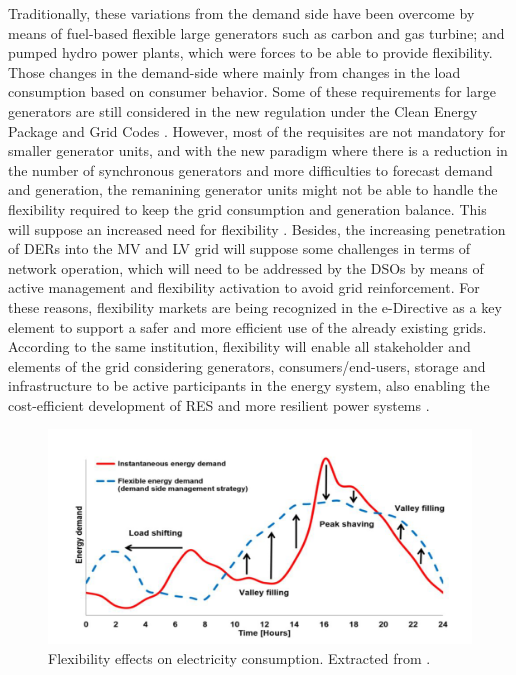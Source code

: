 Traditionally, these variations from the demand side have been overcome by means of fuel-based flexible large generators such as carbon and gas turbine; and pumped hydro power plants, which were forces to be able to provide flexibility. Those changes in the demand-side where mainly from changes in the load consumption based on consumer behavior.
Some of these requirements for large generators are still considered in the new regulation under the Clean Energy Package and Grid Codes \cite{validzic2017clean}. However, most of the requisites are not mandatory for smaller generator units, and with the new paradigm where there is a reduction in the number of synchronous generators and more difficulties to forecast demand and generation, the remanining generator units might not be able to handle the flexibility required to keep the grid consumption and generation balance. This will suppose an increased need for flexibility \cite{Xu2019}. Besides, the increasing penetration of DERs into the MV and LV grid will suppose some challenges in terms of network operation, which will need to be addressed by the DSOs by means of active management and flexibility activation to avoid grid reinforcement. For these reasons, flexibility markets are being recognized in the e-Directive \cite{Directive2019944} as a key element to support a safer and more efficient use of the already existing grids.
According to the same institution, flexibility will enable all stakeholder and elements of the grid considering generators, consumers/end-users, storage and infrastructure to be active participants in the energy system, also enabling the cost-efficient development of RES and more resilient power systems \cite{Hillberg2019}.  

\begin{figure}[h]
	\centering 
	\includegraphics[width=1\columnwidth ]{ChapterIntro/Figures/flex_load_shifting.png}
		\caption{Flexibility effects on electricity consumption. Extracted from \cite{Johra2019}.}  
		\label{fig:load_shifting}
\end{figure}


